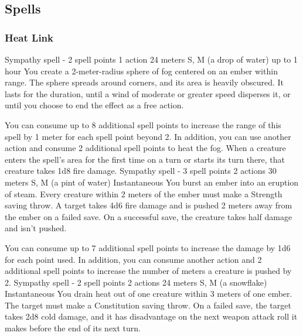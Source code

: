 \subsection*{Spells}
\subsubsection{Heat Link}
        {Sympathy spell - 2 spell points}
        {1 action}
        {24 meters}
        {S, M (a drop of water)}
        {up to 1 hour}
        You create a 2-meter-radius sphere of fog centered on an ember within range.
        The sphere spreads around corners, and its area is heavily obscured.
        It lasts for the duration, until a wind of moderate or greater speed disperses it, or until you choose to end the effect as a free action.

        You can consume up to 8 additional spell points to increase the range of this spell by 1 meter for each spell point beyond 2.
        In addition, you can use another action and consume 2 additional spell points to heat the fog.
        When a creature enters the spell's area for the first time on a turn or starts its turn there, that creature takes 1d8 fire damage.
        {Sympathy spell - 3 spell points}
        {2 actions}
        {30 meters}
        {S, M (a pint of water)}
        {Instantaneous}
        You burst an ember into an eruption of steam.
        Every creature within 2 meters of the ember must make a Strength saving throw.
        A target takes 4d6 fire damage and is pushed 2 meters away from the ember on a failed save.
        On a successful save, the creature takes half damage and isn't pushed.

        You can consume up to 7 additional spell points to increase the damage by 1d6 for each point used.
        In addition, you can consume another action and 2 additional spell points to increase the number of meters a creature is pushed by 2.
        {Sympathy spell - 2 spell points}
        {2 actions}
        {24 meters}
        {S, M (a snowflake)}
        {Instantaneous}
        You drain heat out of one creature within 3 meters of one ember.
        The target must make a Constitution saving throw.
        On a failed save, the target takes 2d8 cold damage, and it has disadvantage on the next weapon attack roll it makes before the end of its next turn.

